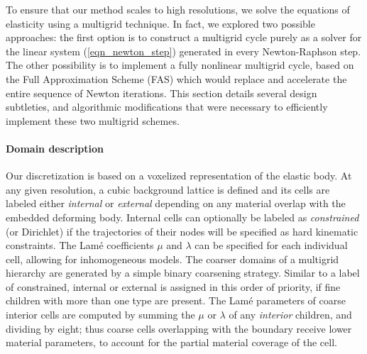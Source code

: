 To ensure that our method scales to high resolutions, we solve the equations of elasticity using a multigrid technique. In fact, we explored two possible approaches: the first option is to construct a multigrid cycle purely as a solver for
the linear system (\ref{eqn_newton_step}) generated in every Newton-Raphson step. The other possibility is to implement a fully nonlinear multigrid cycle, based on the Full
Approximation Scheme (FAS) which would replace and accelerate the entire sequence of Newton iterations. This section details several design subtleties, and algorithmic modifications
that were necessary to efficiently implement these two multigrid schemes. 

\paragraph{Domain description} Our discretization is based on a voxelized representation of the elastic body. At any given resolution, a cubic background lattice is defined and
its cells are labeled either \emph{internal} or \emph{external} depending on any material overlap with the embedded deforming body. Internal cells can optionally be labeled as
\emph{constrained} (or Dirichlet) if the trajectories of their nodes will be specified as hard kinematic constraints. The Lam\'{e} coefficients $\mu$ and $\lambda$ can be specified for
each individual cell, allowing for inhomogeneous models. The coarser domains of a multigrid hierarchy are generated by a simple binary coarsening strategy. Similar to
\cite{Zhu:2010:EMM} a label of constrained, internal or external is assigned in this order of priority, if fine children with more than one type are present. The Lam\'{e} parameters of
coarse interior cells are computed by summing the $\mu$ or $\lambda$ of any \emph{interior} children, and dividing by eight; thus coarse cells overlapping with the boundary receive
lower material parameters, to account for the partial material coverage of the cell.

